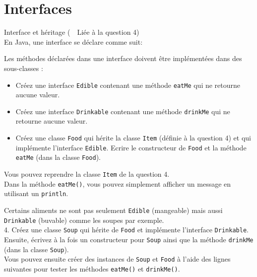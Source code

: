 \section{Interfaces}
\begin{Exercice}[15 minutes]{Interface et héritage (\faLink~~Liée à la question 4)}\\

En Java, une interface se déclare comme suit:
 

Les méthodes déclarées dans une interface doivent être implémentées dans des sous-classes :

 
\begin{itemize}
	\item Créez une interface \lstinline{Edible} contenant une méthode \lstinline{eatMe} qui ne retourne aucune valeur.
	\item Créez une interface \lstinline{Drinkable} contenant une méthode \lstinline{drinkMe} qui ne retourne aucune valeur.
	\item Créez une classe \lstinline{Food} qui hérite la classe \lstinline{Item} (définie à la question 4) et qui implémente l'interface \lstinline{Edible}. Ecrire le constructeur de \lstinline{Food} et la méthode \lstinline{eatMe} (dans la classe \lstinline{Food}).
\end{itemize}

\begin{conseil}
Vous pouvez reprendre la classe \lstinline{Item} de la question 4.\\
Dans la méthode \lstinline{eatMe()}, vous pouvez simplement afficher un message en utilisant un \lstinline{println}.
\end{conseil}

Certains aliments ne sont pas seulement \lstinline{Edible} (mangeable) mais aussi \lstinline{Drinkable} (buvable) comme les soupes par exemple.\\

4. Créez une classe \lstinline{Soup} qui hérite de \lstinline{Food} et implémente l'interface \lstinline{Drinkable}. Ensuite, écrivez à la fois un constructeur pour \lstinline{Soup} ainsi que la méthode \lstinline{drinkMe} (dans la classe \lstinline{Soup}).\\

Vous pouvez ensuite créer des instances de \lstinline{Soup} et \lstinline{Food} à l'aide des lignes suivantes pour tester les méthodes \lstinline{eatMe()} et \lstinline{drinkMe()}.
 

\begin{solution}
 
\end{solution}
\end{Exercice}

